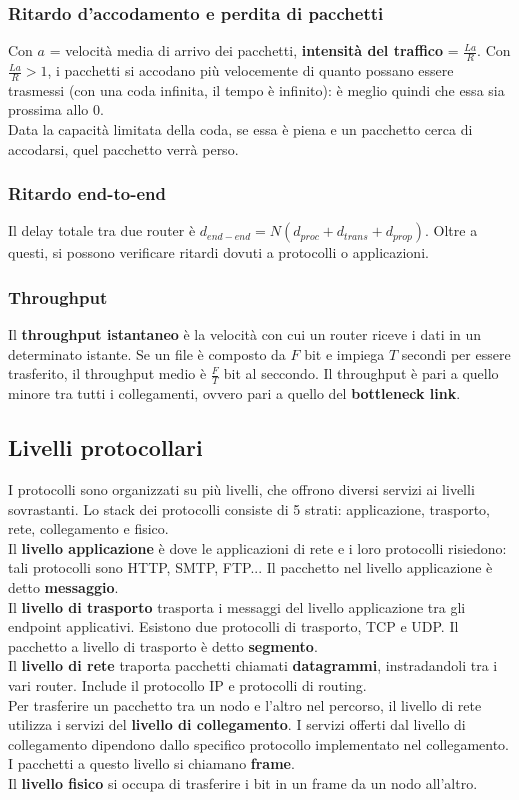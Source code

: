 \documentclass[11pt]{article}
\begin{document}
\subsubsection{Ritardo d'accodamento e perdita di pacchetti}
Con $a$ = velocità media di arrivo dei pacchetti, \textbf{intensità del traffico} = $\frac{La}{R}$. Con $\frac{La}{R}>1$,
i pacchetti si accodano più velocemente di quanto possano essere trasmessi (con una coda infinita, il tempo è infinito):
è meglio quindi che essa sia prossima allo 0.\\
Data la capacità limitata della coda, se essa è piena e un pacchetto cerca di accodarsi, quel pacchetto verrà perso.
\subsubsection{Ritardo end-to-end}
Il delay totale tra due router è $d_{end-end}=N(d_{proc}+d_{trans}+d_{prop})$. Oltre a questi, si possono verificare 
ritardi dovuti a protocolli o applicazioni.
\subsubsection{Throughput}
Il \textbf{throughput istantaneo} è la velocità con cui un router riceve i dati in un determinato istante. Se un file è
composto da $F$ bit e impiega $T$ secondi per essere trasferito, il throughput medio è $\frac{F}{T}$ bit al seccondo. Il
throughput è pari a quello minore tra tutti i collegamenti, ovvero pari a quello del \textbf{bottleneck link}.
\subsection{Livelli protocollari}
I protocolli sono organizzati su più livelli, che offrono diversi servizi ai livelli sovrastanti. Lo stack dei protocolli
consiste di 5 strati: applicazione, trasporto, rete, collegamento e fisico.\\
Il \textbf{livello applicazione} è dove le applicazioni di rete e i loro protocolli risiedono: tali protocolli sono HTTP,
SMTP, FTP... Il pacchetto nel livello applicazione è detto \textbf{messaggio}.\\
Il \textbf{livello di trasporto} trasporta i messaggi del livello applicazione tra gli endpoint applicativi. Esistono 
due protocolli di trasporto, TCP e UDP. Il pacchetto a livello di trasporto è detto \textbf{segmento}.\\
Il \textbf{livello di rete} traporta pacchetti chiamati \textbf{datagrammi}, instradandoli tra i vari router. Include 
il protocollo IP e protocolli di routing.\\
Per trasferire un pacchetto tra un nodo e l'altro nel percorso, il livello di rete utilizza i servizi del
\textbf{livello di collegamento}. I servizi offerti dal livello di collegamento dipendono dallo specifico protocollo
implementato nel collegamento. I pacchetti a questo livello si chiamano \textbf{frame}.\\
Il \textbf{livello fisico} si occupa di trasferire i bit in un frame da un nodo all'altro.
\end{document}
